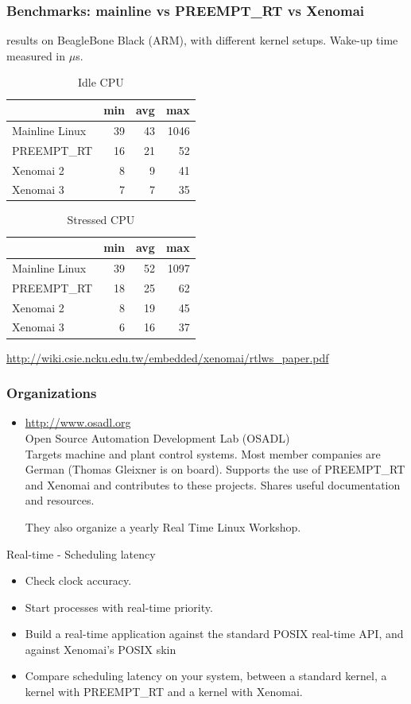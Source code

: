 \begin{frame}
  \frametitle{Benchmarks: mainline vs PREEMPT\_RT vs Xenomai }
   results on BeagleBone Black (ARM), with different
  kernel setups. Wake-up time measured in $\mu$s.
  \scriptsize
  \begin{table}[h]
  \caption{Idle CPU}
  \begin{tabular}{| l || r | r | r |}
  \hline
  & min & avg & max \\
  \hline
  Mainline Linux & 39 & 43 & 1046 \\
  \hline
  PREEMPT\_RT & 16 & 21 & 52 \\
  \hline
  Xenomai 2 & 8 & 9 & 41 \\
  \hline
  Xenomai 3 & 7 & 7 & 35 \\
  \hline
  \end{tabular}
  \end{table}
  \begin{table}[h]
  \caption{Stressed CPU}
  \begin{tabular}{| l || r | r | r |}
  \hline
  & min & avg & max \\
  \hline
  Mainline Linux & 39 & 52 & 1097 \\
  \hline
  PREEMPT\_RT & 18 & 25 & 62 \\
  \hline
  Xenomai 2 & 8 & 19 & 45 \\
  \hline
  Xenomai 3 & 6 & 16 & 37 \\
  \hline
  \end{tabular}
  \end{table}
  \url{http://wiki.csie.ncku.edu.tw/embedded/xenomai/rtlws_paper.pdf}
\end{frame}

\begin{frame}
  \frametitle{Organizations}
  \begin{itemize}
  \item \url{http://www.osadl.org}\\
    Open Source Automation Development Lab (OSADL)\\
    Targets machine and plant control systems. Most member companies
    are German (Thomas Gleixner is on board). Supports the use of
    PREEMPT\_RT and Xenomai and contributes to these projects. Shares
    useful documentation and resources.

    They also organize a yearly Real Time Linux Workshop.
  \end{itemize}
\end{frame}

\setuplabframe
{Real-time - Scheduling latency}
{
  \begin{itemize}
  \item Check clock accuracy.
  \item Start processes with real-time priority.
  \item Build a real-time application against the standard POSIX
        real-time API, and against Xenomai’s POSIX skin
  \item Compare scheduling latency on your system, between a standard
        kernel, a kernel with PREEMPT\_RT and a kernel with Xenomai.
  \end{itemize}
}

